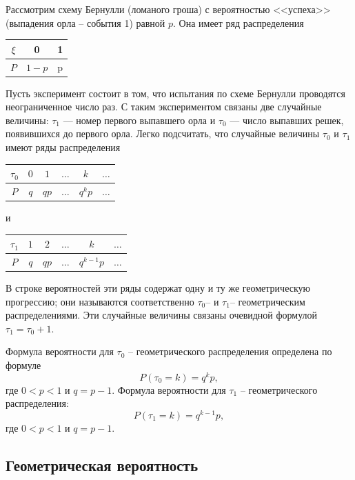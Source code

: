 \begin{example}
Рассмотрим схему Бернулли (ломаного гроша) с вероятностью <<успеха>> (выпадения орла -- события 1) равной $p$. Она имеет ряд распределения

\begin{center}
	\begin{tabular}{|c|c|c|}
		\hline
		$\xi$ & 0 & 1  \\ \hline
		$P$  & $1-p$ & p \\ \hline
	\end{tabular}
\end{center}

Пусть эксперимент состоит в том, что испытания по схеме Бернулли проводятся неограниченное число раз. С таким экспериментом связаны две случайные величины: $\tau_1$ — номер первого выпавшего орла и $\tau_0$ — число выпавших решек, появившихся до первого орла. Легко подсчитать, что случайные величины $\tau_0$ и $\tau_1$ имеют ряды распределения

\begin{center}
	\begin{tabular}{|c|c|c|c|c|c|}
		\hline
		$\tau_0$ & $0$ & $1$ & $\ldots$ & $k$ & $\ldots$ \\ \hline
		$P$  & $q$ & $qp$ & $\ldots$  & $q^k p$& $\ldots$ \\ \hline
	\end{tabular}
	\quad и \quad
	\begin{tabular}{|c|c|c|c|c|c|}
		\hline
		$\tau_1$ & $1$ & $2$ & $\ldots$ & $k$ & $\ldots$ \\ \hline
		$P$  & $q$ & $qp$ & $\ldots$  & $q^{k-1} p$& $\ldots$ \\ \hline
	\end{tabular}
\end{center}

В строке вероятностей эти ряды содержат одну и ту же геометрическую
прогрессию; они называются соответственно $\tau_0$-- и $\tau_1$-- геометрическим распределениями. Эти случайные величины связаны очевидной формулой $\tau_1 = \tau_0 + 1$.

Формула вероятности для $\tau_0$ -- геометрического распределения определена по формуле
$$P(\tau_0 = k) = q^k p,$$
где $0 < p < 1$ и $q = p − 1$.
Формула вероятности для $\tau_1$ -- геометрического распределения:
$$P(\tau_1 = k) = q^{k−1} p,$$
где $0 < p < 1$ и $q = p − 1.$
\end{example}

\subsection{Геометрическая вероятность}

